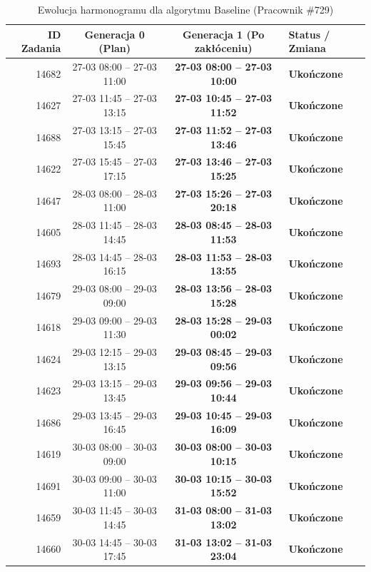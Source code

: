 \begin{table}[htbp]
\centering\small
\caption{Ewolucja harmonogramu dla algorytmu Baseline (Pracownik \#729)}
\label{tab:case_study_baseline_u729}
\begin{tabular}{|r|c|c|l|}
\hline
\textbf{ID Zadania} & \textbf{Generacja 0 (Plan)} & \textbf{Generacja 1 (Po zakłóceniu)} & \textbf{Status / Zmiana} \\ \hline
14682 & 27-03 08:00 -- 27-03 11:00 & \textbf{27-03 08:00 -- 27-03 10:00} & \textbf{Ukończone} \\ 
14627 & 27-03 11:45 -- 27-03 13:15 & \textbf{27-03 10:45 -- 27-03 11:52} & \textbf{Ukończone} \\ 
14688 & 27-03 13:15 -- 27-03 15:45 & \textbf{27-03 11:52 -- 27-03 13:46} & \textbf{Ukończone} \\ 
14622 & 27-03 15:45 -- 27-03 17:15 & \textbf{27-03 13:46 -- 27-03 15:25} & \textbf{Ukończone} \\ 
14647 & 28-03 08:00 -- 28-03 11:00 & \textbf{27-03 15:26 -- 27-03 20:18} & \textbf{Ukończone} \\ 
14605 & 28-03 11:45 -- 28-03 14:45 & \textbf{28-03 08:45 -- 28-03 11:53} & \textbf{Ukończone} \\ 
14693 & 28-03 14:45 -- 28-03 16:15 & \textbf{28-03 11:53 -- 28-03 13:55} & \textbf{Ukończone} \\ 
14679 & 29-03 08:00 -- 29-03 09:00 & \textbf{28-03 13:56 -- 28-03 15:28} & \textbf{Ukończone} \\ 
14618 & 29-03 09:00 -- 29-03 11:30 & \textbf{28-03 15:28 -- 29-03 00:02} & \textbf{Ukończone} \\ 
14624 & 29-03 12:15 -- 29-03 13:15 & \textbf{29-03 08:45 -- 29-03 09:56} & \textbf{Ukończone} \\ 
14623 & 29-03 13:15 -- 29-03 13:45 & \textbf{29-03 09:56 -- 29-03 10:44} & \textbf{Ukończone} \\ 
14686 & 29-03 13:45 -- 29-03 16:45 & \textbf{29-03 10:45 -- 29-03 16:09} & \textbf{Ukończone} \\ 
14619 & 30-03 08:00 -- 30-03 09:00 & \textbf{30-03 08:00 -- 30-03 10:15} & \textbf{Ukończone} \\ 
14691 & 30-03 09:00 -- 30-03 11:00 & \textbf{30-03 10:15 -- 30-03 15:52} & \textbf{Ukończone} \\ 
14659 & 30-03 11:45 -- 30-03 14:45 & \textbf{31-03 08:00 -- 31-03 13:02} & \textbf{Ukończone} \\ 
14660 & 30-03 14:45 -- 30-03 17:45 & \textbf{31-03 13:02 -- 31-03 23:04} & \textbf{Ukończone} \\ 

\end{tabular}
\end{table}
